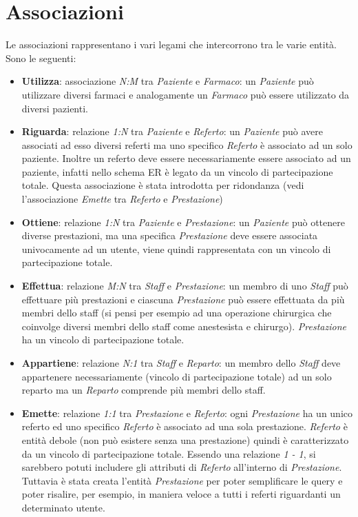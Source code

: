 \documentclass[paper=a4, fontsize=11pt,x11names]{report}
\begin{document}
\section{Associazioni}
Le associazioni rappresentano i vari legami che intercorrono tra le varie entità. Sono le seguenti:
\begin{itemize}
\item \textbf{Utilizza}: associazione \textit{N:M} tra \textit{Paziente} e \textit{Farmaco}: un \textit{Paziente} può utilizzare diversi farmaci e analogamente un \textit{Farmaco} può essere utilizzato da diversi pazienti.
\item \textbf{Riguarda}: relazione \textit{1:N} tra \textit{Paziente} e \textit{Referto}: un \textit{Paziente} può avere associati ad esso diversi referti ma uno specifico \textit{Referto} è associato ad un solo paziente. Inoltre un referto deve essere necessariamente essere associato ad un paziente, infatti nello schema ER è legato da un vincolo di partecipazione totale. Questa associazione è stata introdotta per ridondanza (vedi l'associazione \textit{Emette} tra \textit{Referto} e \textit{Prestazione})
\item \textbf{Ottiene}: relazione \textit{1:N} tra \textit{Paziente} e \textit{Prestazione}: un \textit{Paziente} può ottenere diverse prestazioni, ma una specifica \textit{Prestazione} deve essere associata univocamente ad un utente, viene quindi rappresentata con un vincolo di partecipazione totale.
\item \textbf{Effettua}: relazione \textit{M:N} tra \textit{Staff} e \textit{Prestazione}: un membro di uno \textit{Staff} può effettuare più prestazioni e ciascuna \textit{Prestazione} può essere effettuata da più membri dello staff (si pensi per esempio ad una operazione chirurgica che coinvolge diversi membri dello staff come anestesista e chirurgo). \textit{Prestazione} ha un vincolo di partecipazione totale.
\item \textbf{Appartiene}: relazione \textit{N:1} tra \textit{Staff} e \textit{Reparto}: un membro dello \textit{Staff} deve appartenere necessariamente (vincolo di partecipazione totale) ad un solo reparto ma un \textit{Reparto} comprende più membri dello staff.
\item \textbf{Emette}: relazione \textit{1:1} tra \textit{Prestazione} e \textit{Referto}: ogni \textit{Prestazione} ha un unico referto ed uno specifico \textit{Referto} è associato ad una sola prestazione. \textit{Referto} è entità debole (non può esistere senza una prestazione) quindi è caratterizzato da un vincolo di partecipazione totale. Essendo una relazione \textit{1 - 1}, si sarebbero potuti includere gli attributi di \textit{Referto} all'interno di \textit{Prestazione}. Tuttavia è stata creata l'entità \textit{Prestazione} per poter semplificare le query e poter risalire, per esempio, in maniera veloce a tutti i referti riguardanti un determinato utente.

\end{itemize}
\end{document}
